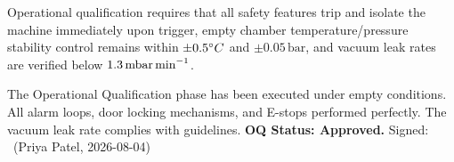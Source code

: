\begin{acceptancebox}
Operational qualification requires that all safety features trip and isolate the machine immediately upon trigger, empty chamber temperature/pressure stability control remains within \(\pm 0.5\degC\) and \(\pm 0.05\,\text{bar}\), and vacuum leak rates are verified below \(1.3\,\text{mbar\,min}^{-1}\).
\end{acceptancebox}

\begin{verdictbox}
The Operational Qualification phase has been executed under empty conditions. All alarm loops, door locking mechanisms, and E-stops performed perfectly. The vacuum leak rate complies with guidelines.
\textbf{OQ Status: Approved.} Signed: \makebox[3.0cm]{\hrulefill}\ (Priya Patel, 2026-08-04)
\end{verdictbox}
